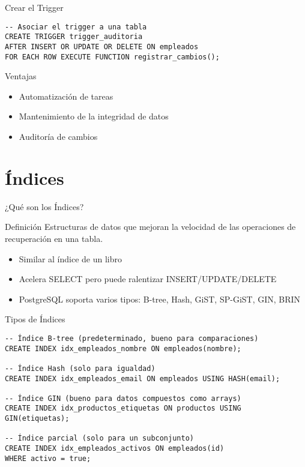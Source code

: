 \documentclass{beamer}
\begin{document}
\begin{frame}[fragile]{Crear el Trigger}
\begin{lstlisting}
-- Asociar el trigger a una tabla
CREATE TRIGGER trigger_auditoria
AFTER INSERT OR UPDATE OR DELETE ON empleados
FOR EACH ROW EXECUTE FUNCTION registrar_cambios();
\end{lstlisting}

\begin{block}{Ventajas}
\begin{itemize}
\item Automatización de tareas
\item Mantenimiento de la integridad de datos
\item Auditoría de cambios
\end{itemize}
\end{block}
\end{frame}

\section{Índices}
\begin{frame}{¿Qué son los Índices?}
\begin{block}{Definición}
Estructuras de datos que mejoran la velocidad de las operaciones de recuperación en una tabla.
\end{block}

\begin{itemize}
\item Similar al índice de un libro
\item Acelera SELECT pero puede ralentizar INSERT/UPDATE/DELETE
\item PostgreSQL soporta varios tipos: B-tree, Hash, GiST, SP-GiST, GIN, BRIN
\end{itemize}
\end{frame}

\begin{frame}[fragile]{Tipos de Índices}
\begin{lstlisting}
-- Índice B-tree (predeterminado, bueno para comparaciones)
CREATE INDEX idx_empleados_nombre ON empleados(nombre);

-- Índice Hash (solo para igualdad)
CREATE INDEX idx_empleados_email ON empleados USING HASH(email);

-- Índice GIN (bueno para datos compuestos como arrays)
CREATE INDEX idx_productos_etiquetas ON productos USING GIN(etiquetas);

-- Índice parcial (solo para un subconjunto)
CREATE INDEX idx_empleados_activos ON empleados(id) 
WHERE activo = true;
\end{lstlisting}
\end{frame}
\end{document}
